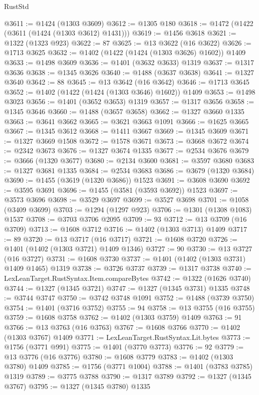 \begin{lexlean}{RustStd}
\begin{coremodule}
@3611 := @1424 (@1303 @3609)
@3612 := @1305 @180
@3618 := @1472 (@1422 (@3611 (@1424 (@1303 @3612) @1431)))
@3619 := @1456 @3618
@3621 := @1322 (@1323 @923)
@3622 := 87
@3625 := @13 @3622 (@16 @3622)
@3626 := @1713 @3625
@3632 := @1402 (@1422 (@1424 (@1303 @3626) @1602)) @1409
@3633 := @1498 @3609
@3636 := @1401 (@3632 @3633) @1319
@3637 := @1317 @3636
@3638 := @1345 @3626
@3640 := @1488 (@3637 @3638)
@3641 := @1327 @3640
@3642 := 88
@3645 := @13 @3642 (@16 @3642)
@3646 := @1713 @3645
@3652 := @1402 (@1422 (@1424 (@1303 @3646) @1602)) @1409
@3653 := @1498 @3023
@3656 := @1401 (@3652 @3653) @1319
@3657 := @1317 @3656
@3658 := @1345 @3646
@3660 := @1488 (@3657 @3658)
@3662 := @1327 @3660 @1335
@3663 := @3641 @3662
@3665 := @3621 @3663 @1091
@3666 := @1625 @3665
@3667 := @1345 @3612
@3668 := @1411 @3667
@3669 := @1345 @3609
@3671 := @1327 @3669 @1508
@3672 := @1578 @3671
@3673 := @3668 @3672
@3674 := @2342 @3673
@3676 := @1327 @3674 @1335
@3677 := @2534 @3676
@3679 := @3666 (@1320 @3677)
@3680 := @2134 @3600
@3681 := @3597 @3680
@3683 := @1327 @3681 @1335
@3684 := @2534 @3683
@3686 := @3679 (@1320 @3684)
@3690 := @1455 (@3619 (@1320 @3686)) @1523
@3691 := @3608 @3690
@3692 := @3595 @3691
@3696 := @1455 (@3581 (@3593 @3692)) @1523
@3697 := @3573 @3696
@3698 := @3529 @3697
@3699 := @3527 @3698
@3701 := @1058 (@3409 @3699)
@3703 := @1294 (@1297 @923)
@3706 := @1301 (@1308 @1083) @1537
@3708 := @3703 @3706 @2095
@3709 := 93
@3712 := @13 @3709 (@16 @3709)
@3713 := @1608 @3712
@3716 := @1402 (@1303 @3713) @1409
@3717 := 89
@3720 := @13 @3717 (@16 @3717)
@3721 := @1608 @3720
@3726 := @1401 (@1402 (@1303 @3721) @1409 @1346)
@3727 := 90
@3730 := @13 @3727 (@16 @3727)
@3731 := @1608 @3730
@3737 := @1401 (@1402 (@1303 @3731) @1409 @1465) @1319
@3738 := @3726 @3737
@3739 := @1317 @3738
@3740 := LexLeanTarget.RustSyntax.Item.compareBytes
@3742 := @1322 (@1626 @3740)
@3744 := @1327 (@1345 @3721)
@3747 := @1327 (@1345 @3731) @1335
@3748 := @3744 @3747
@3750 := @3742 @3748 @1091
@3752 := @1488 (@3739 @3750)
@3754 := @1401 (@3716 @3752)
@3755 := 94
@3758 := @13 @3755 (@16 @3755)
@3759 := @1608 @3758
@3762 := @1402 (@1303 @3759) @1409
@3763 := 91
@3766 := @13 @3763 (@16 @3763)
@3767 := @1608 @3766
@3770 := @1402 (@1303 @3767) @1409
@3771 := LexLeanTarget.RustSyntax.Lit.bytes
@3773 := @1756 (@3771 @991)
@3775 := @1401 (@3770 @3773)
@3776 := 92
@3779 := @13 @3776 (@16 @3776)
@3780 := @1608 @3779
@3783 := @1402 (@1303 @3780) @1409
@3785 := @1756 (@3771 @1004)
@3788 := @1401 (@3783 @3785) @1319
@3789 := @3775 @3788
@3790 := @1317 @3789
@3792 := @1327 (@1345 @3767)
@3795 := @1327 (@1345 @3780) @1335

\end{coremodule}
\end{lexlean}
